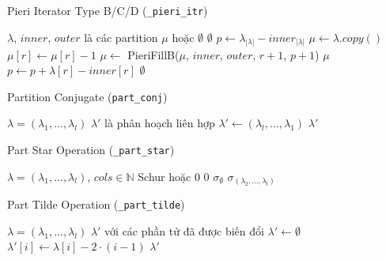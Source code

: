 \begin{algorithm}[H]
\caption{Pieri Iterator Type B/C/D (\texttt{\_pieri\_itr})}
\begin{algorithmic}[1]
\REQUIRE $\lambda$, $inner$, $outer$ là các partition
\ENSURE $\mu$ hoặc $\emptyset$
\IF{$\lambda = \emptyset$}
    \RETURN $\emptyset$
\ENDIF
\STATE $p \gets \lambda_{|\lambda|} - inner_{|\lambda|}$
        \STATE $\mu \gets \lambda.copy()$
        \STATE $\mu[r] \gets \mu[r] - 1$
        \STATE $\mu \gets$ PieriFillB($\mu$, $inner$, $outer$, $r+1$, $p+1$)
        \IF{$\mu \neq \emptyset$}
            \RETURN $\mu$
        \ENDIF
    \ENDIF
    \STATE $p \gets p + \lambda[r] - inner[r]$
\ENDFOR
\RETURN $\emptyset$
\end{algorithmic}
\end{algorithm}

\begin{algorithm}[H]
\caption{Partition Conjugate (\texttt{part\_conj})}
\begin{algorithmic}[1]
\REQUIRE $\lambda = (\lambda_1, ..., \lambda_l)$
\ENSURE $\lambda'$ là phân hoạch liên hợp
\STATE $\lambda' \gets (\lambda_l, ..., \lambda_1)$
\RETURN $\lambda'$
\end{algorithmic}
\end{algorithm}

\begin{algorithm}[H]
\caption{Part Star Operation (\texttt{\_part\_star})}
\begin{algorithmic}[1]
\REQUIRE $\lambda = (\lambda_1, ..., \lambda_l)$, $cols \in \mathbb{N}$
\ENSURE Schur hoặc $0$
    \RETURN $0$
\ENDIF
{}
    \RETURN $\sigma_{\emptyset}$
\ENDIF
\RETURN $\sigma_{(\lambda_2, ..., \lambda_l)}$
\end{algorithmic}
\end{algorithm}

\begin{algorithm}[H]
\caption{Part Tilde Operation (\texttt{\_part\_tilde})}
\begin{algorithmic}[1]
\REQUIRE $\lambda = (\lambda_1, ..., \lambda_l)$
\ENSURE $\lambda'$ với các phần tử đã được biến đổi
\STATE $\lambda' \gets \emptyset$
    \STATE $\lambda'[i] \gets \lambda[i] - 2 \cdot (i-1)$
\ENDFOR
\RETURN $\lambda'$
\end{algorithmic}
\end{algorithm}

